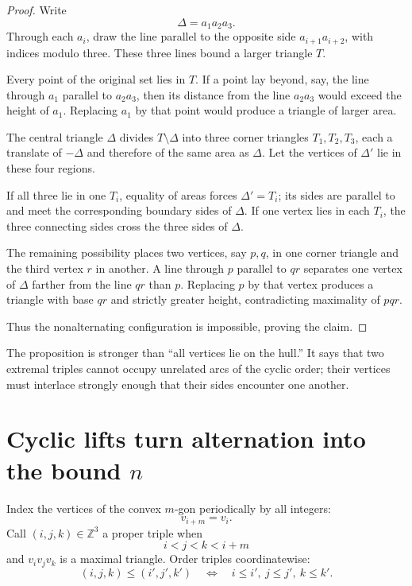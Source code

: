 \begin{proof}
Write
\[
  \Delta=a_1a_2a_3.
\]
Through each \(a_i\), draw the line parallel to the opposite side \(a_{i+1}a_{i+2}\), with indices modulo three.  These three lines bound a larger triangle \(T\).

Every point of the original set lies in \(T\).  If a point lay beyond, say, the line through \(a_1\) parallel to \(a_2a_3\), then its distance from the line \(a_2a_3\) would exceed the height of \(a_1\).  Replacing \(a_1\) by that point would produce a triangle of larger area.

The central triangle \(\Delta\) divides \(T\setminus\Delta\) into three corner triangles \(T_1,T_2,T_3\), each a translate of \(-\Delta\) and therefore of the same area as \(\Delta\).  Let the vertices of \(\Delta'\) lie in these four regions.

If all three lie in one \(T_i\), equality of areas forces \(\Delta'=T_i\); its sides are parallel to and meet the corresponding boundary sides of \(\Delta\).  If one vertex lies in each \(T_i\), the three connecting sides cross the three sides of \(\Delta\).

The remaining possibility places two vertices, say \(p,q\), in one corner triangle and the third vertex \(r\) in another.  A line through \(p\) parallel to \(qr\) separates one vertex of \(\Delta\) farther from the line \(qr\) than \(p\).  Replacing \(p\) by that vertex produces a triangle with base \(qr\) and strictly greater height, contradicting maximality of \(pqr\).

Thus the nonalternating configuration is impossible, proving the claim.
\end{proof}

The proposition is stronger than “all vertices lie on the hull.”  It says that two extremal triples cannot occupy unrelated arcs of the cyclic order; their vertices must interlace strongly enough that their sides encounter one another.

\section{Cyclic lifts turn alternation into the bound \texorpdfstring{$n$}{n}}

Index the vertices of the convex \(m\)-gon periodically by all integers:
\[
  v_{i+m}=v_i.
\]
Call \((i,j,k)\in\mathbb Z^3\) a proper triple when
\[
  i<j<k<i+m
\]
and \(v_iv_jv_k\) is a maximal triangle.  Order triples coordinatewise:
\[
  (i,j,k)\le(i',j',k')
  \quad\Longleftrightarrow\quad
  i\le i',\ j\le j',\ k\le k'.
\]

